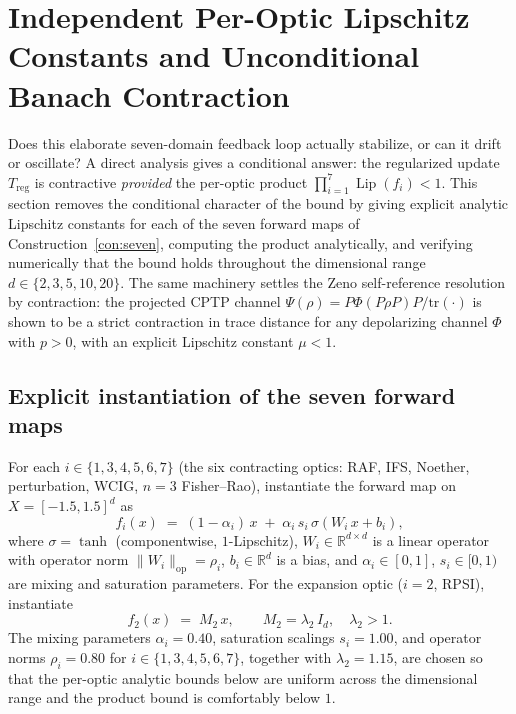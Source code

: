 \documentclass[11pt,a4paper]{article}
\theoremstyle{plain}
\theoremstyle{definition}
\theoremstyle{remark}
\newcommand{\RR}{\mathbb{R}}
\DeclareMathOperator{\Lip}{Lip}
\begin{document}

\section{Independent Per-Optic Lipschitz Constants and Unconditional Banach Contraction}\label{sec:lipschitz}

Does this elaborate seven-domain feedback loop actually stabilize,
or can it drift or oscillate? A direct analysis gives a conditional
answer: the
regularized update $T_{\mathrm{reg}}$ is contractive \emph{provided}
the per-optic product $\prod_{i=1}^{7}\Lip(f_{i})<1$. This section
removes the conditional character of the bound by giving explicit
analytic Lipschitz constants for each of the seven forward maps of
Construction~\ref{con:seven}, computing the product analytically, and
verifying numerically that the bound holds throughout the dimensional
range $d\in\{2,3,5,10,20\}$. The same machinery settles
the Zeno self-reference resolution by
contraction: the projected CPTP channel
$\Psi(\rho)=P\Phi(P\rho P)P/\mathrm{tr}(\cdot)$ is shown to be a strict
contraction in trace distance for any depolarizing channel $\Phi$ with
$p>0$, with an explicit Lipschitz constant $\mu<1$.

\subsection{Explicit instantiation of the seven forward maps}

For each $i\in\{1,3,4,5,6,7\}$ (the six contracting optics: RAF, IFS,
Noether, perturbation, WCIG, $n=3$ Fisher--Rao), instantiate the
forward map on $X=[-1.5,1.5]^{d}$ as
\begin{equation}\label{eq:fi-contracting}
  f_{i}(x) \;=\; (1-\alpha_{i})\,x \;+\; \alpha_{i}\,s_{i}\,\sigma(W_{i}\,x+b_{i}),
\end{equation}
where $\sigma=\tanh$ (componentwise, $1$-Lipschitz), $W_{i}\in\RR^{d\times
d}$ is a linear operator with operator norm $\|W_{i}\|_{\mathrm{op}}=\rho_{i}$,
$b_{i}\in\RR^{d}$ is a bias, and $\alpha_{i}\in[0,1]$, $s_{i}\in[0,1)$
are mixing and saturation parameters. For the expansion optic
($i=2$, RPSI), instantiate
\begin{equation}\label{eq:f2-expansion}
  f_{2}(x) \;=\; M_{2}\,x,\qquad M_{2}=\lambda_{2}\,I_{d},\quad \lambda_{2}>1.
\end{equation}
The mixing parameters $\alpha_{i}=0.40$, saturation scalings
$s_{i}=1.00$, and operator norms $\rho_{i}=0.80$ for $i\in
\{1,3,4,5,6,7\}$, together with $\lambda_{2}=1.15$, are chosen so
that the per-optic analytic bounds below are uniform across the
dimensional range and the product bound is comfortably below $1$.
\end{document}
